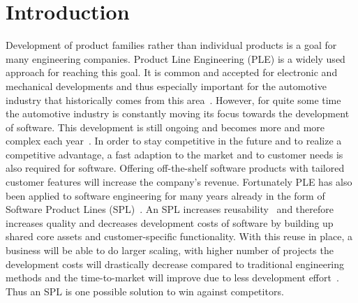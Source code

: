 \section{Introduction}\label{introduction}

Development of product families rather than individual products is a goal for
many engineering companies. Product Line Engineering (PLE) is a widely used
approach for reaching this goal. It is common and accepted for electronic and
mechanical developments and thus especially important for the automotive
industry that historically comes from this area~\cite{bookssp19X19}. However,
for quite some time the automotive industry is constantly moving its focus
towards the development of software. This development is still ongoing and
becomes more and more complex each year~\cite{ICSE03498}. In order to stay
competitive in the future and to realize a competitive advantage, a fast
adaption to the market and to customer needs is also required for software.
Offering off-the-shelf software products with tailored customer features will
increase the company's revenue. Fortunately PLE has also been applied to
software engineering for many years already in the form of Software Product
Lines (SPL)~\cite{confsplc2000}. An SPL increases reusability~\cite{Clem02a} and
therefore increases quality and decreases development costs of software by
building up shared core assets and customer-specific functionality. With this
reuse in place, a business will be able to do larger scaling, with higher number
of projects the development costs will drastically decrease compared to
traditional engineering methods and the time-to-market will improve due to less
development effort~\cite{confsplcAzanzaMD21}. Thus an SPL is one possible
solution to win against competitors.

